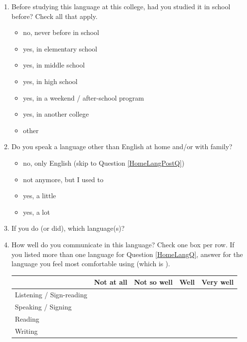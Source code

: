 \documentclass[letterpaper,10pt]{article}
\begin{document}
\begin{enumerate}[resume]

\item Before studying this language at this college, had you studied it in school before? Check all that apply.
\vspace{-0.1in}\begin{multicols}{2}
\begin{itemize}
	\item no, never before in school
	\item yes, in elementary school
	\item yes, in middle school
	\item yes, in high school
	\item yes, in a weekend / after-school program
	\item yes, in another college
	\item other \underline{\hspace{2in}}
\end{itemize}
\end{multicols}


\item \label{HomeLangQ}Do you speak a language other than English at home and/or with family?
\vspace{-0.1in}\begin{multicols}{2}
\begin{itemize}
	\item no, only English (skip to Question \ref{HomeLangPostQ})
	\item not anymore, but I used to
	\item yes, a little
	\item yes, a lot
\end{itemize}
\end{multicols}

\item If you do (or did), which language(s)?  \underline{\hspace{2.5in}}


\item How well do you communicate in this language? Check one box per row. If you listed more than one
language for Question \ref{HomeLangQ}, answer for the language you feel most comfortable using (which is \underline{\hspace{1in}}).\\[-0.05in]

\renewcommand{\arraystretch}{1.5}
\begin{tabular}{|p{1.5in}|p{0.8in}|p{0.8in}|p{0.8in}|p{0.8in}|}
\hline
 & Not at all & Not so well & Well & Very well \\
\hline
Listening / Sign-reading & & & & \\
\hline
Speaking / Signing & & & & \\
\hline
Reading & & & & \\
\hline
Writing & & & & \\
\hline
\end{tabular}


\end{enumerate}
\end{document}
